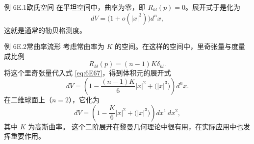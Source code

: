 \begin{statement}{例 6E.1}{欧氏空间}
在平坦空间中，曲率为零，即 $R_{kl}(p)=0$。展开式于是化为
\[
  dV=\bigl(1+o(|x|^3)\bigr)d^n x,
\]
这就是通常的勒贝格测度。
\end{statement}

\begin{statement}{例 6E.2}{常曲率流形}
考虑常曲率为 $K$ 的空间。在这样的空间中，里奇张量与度量成比例
\[
  R_{kl}(p)=(n-1)K\delta_{kl}.
\]
将这个里奇张量代入式 \eqref{eq:6E67}，得到体积元的展开式
\[
  dV=\left(1-\frac{(n-1)K}{6}|x|^2+\bigl(|x|^3\bigr)\right)d^n x.
\]
在二维球面上（$n=2$），它化为
\[
  dV=\left(1-\frac K6|x|^2+\bigl(|x|^3\bigr)\right)dx^1\,dx^2,
\]
其中 $K$ 为高斯曲率。%
这个二阶展开在黎曼几何理论中很有用，在实际应用中也发挥重要作用。
\end{statement}
